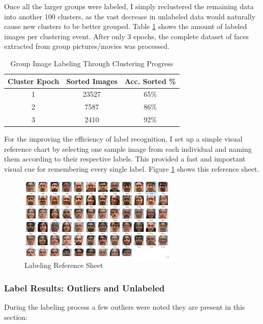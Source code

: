 \documentclass[11pt]{article}
\begin{document}
        Once all the larger groups were labeled, I simply reclustered the remaining data into another 100 clusters, as the vast decrease in unlabeled data would naturally cause new clusters to be better grouped. Table \ref{table:cluster_passes} shows the amount of labeled images per clustering event. After only 3 epochs, the complete dataset of faces extracted from group pictures/movies was processed.

        \begin{table}[h!]
            \centering
            \begin{tabular}{||c c c||}\label{tab:cluster_passes}
                \hline
                Cluster Epoch & Sorted Images & Acc. Sorted \% \\ [0.5ex]
                \hline\hline
                1 & 23527 &  65\% \\
                \hline
                2 & 7587 &  86\% \\
                \hline
                3 & 2410 & 92\% \\
                \hline
           \end{tabular}
           \caption{Group Image Labeling Through Clustering Progress}
            \label{table:cluster_passes}
        \end{table}

        For the improving the efficiency of label recognition, I set up a simple visual reference chart by selecting one sample image from each individual and naming them according to their respective labels. This provided a fast and important visual cue for remembering every single label. Figure \ref{fig:label:cheatsheet} shows this reference sheet.

        \begin{figure}[ht]
            \centering
            \includegraphics[height=4cm]{./Images/labeling/cheatsheet.png}
            \caption{Labeling Reference Sheet}
            \label{fig:label:cheatsheet}
        \end{figure}

    \subsubsection{Label Results: Outliers and Unlabeled}\label{sec:face_labeling:outliers}
        During the labeling process a few outliers were noted they are present in this section:
\end{document}
